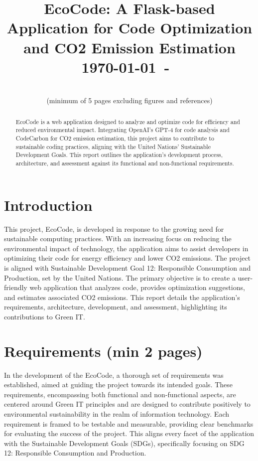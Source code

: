 \documentclass[conference,compsoc]{IEEEtran}
\begin{document}
\title{EcoCode: A Flask-based Application for Code Optimization and CO2 Emission Estimation\\
{\small \today~-~\currenttime}}

\author{
\\
(minimum of 5 pages excluding figures and references)\\}

\maketitle

\begin{abstract}
    EcoCode is a web application designed to analyze and optimize  code for efficiency and reduced environmental impact. Integrating OpenAI's GPT-4 for code analysis and CodeCarbon for CO2 emission estimation, this project aims to contribute to sustainable coding practices, aligning with the United Nations' Sustainable Development Goals. This report outlines the application's development process, architecture, and assessment against its functional and non-functional requirements.
\end{abstract}
    

\section{Introduction}

This project, EcoCode, is developed in response to the growing need for sustainable computing practices. With an increasing focus on reducing the environmental impact of technology, the application aims to assist developers in optimizing their code for energy efficiency and lower CO2 emissions. The project is aligned with Sustainable Development Goal 12: Responsible Consumption and Production, set by the United Nations. The primary objective is to create a user-friendly web application that analyzes  code, provides optimization suggestions, and estimates associated CO2 emissions. This report details the application's requirements, architecture, development, and assessment, highlighting its contributions to Green IT.

\section{Requirements (min 2 pages)}
In the development of the EcoCode, a thorough set of requirements was established, aimed at guiding the project towards its intended goals. These requirements, encompassing both functional and non-functional aspects, are centered around Green IT principles and are designed to contribute positively to environmental sustainability in the realm of information technology. Each requirement is framed to be testable and measurable, providing clear benchmarks for evaluating the success of the project. This aligns every facet of the application with the Sustainable Development Goals (SDGs), specifically focusing on SDG 12: Responsible Consumption and Production.
\end{document}
